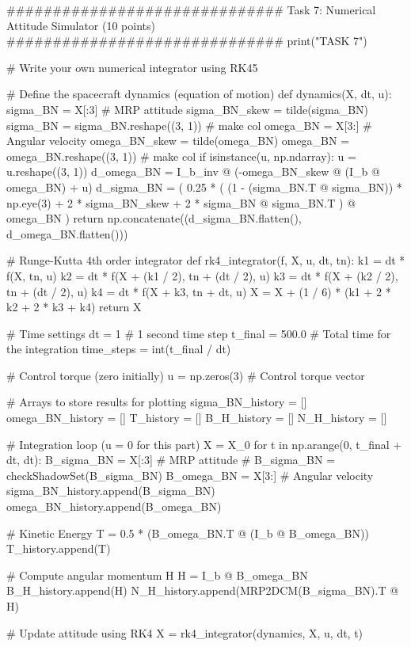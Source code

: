 \documentclass[conf]{new-aiaa}
\begin{document}
\begin{pythoncode}
############################## Task 7: Numerical Attitude Simulator (10 points) ##############################
print("\n\nBEGIN TASK 7")

# Write your own numerical integrator using RK45


# Define the spacecraft dynamics (equation of motion)
def dynamics(X, dt, u):
    sigma_BN = X[:3]  # MRP attitude
    sigma_BN_skew = tilde(sigma_BN)
    sigma_BN = sigma_BN.reshape((3, 1))  # make col
    omega_BN = X[3:]  # Angular velocity
    omega_BN_skew = tilde(omega_BN)
    omega_BN = omega_BN.reshape((3, 1))  # make col
    if isinstance(u, np.ndarray):
        u = u.reshape((3, 1))
    d_omega_BN = I_b_inv @ (-omega_BN_skew @ (I_b @ omega_BN) + u)
    d_sigma_BN = (
        0.25
        * (
            (1 - (sigma_BN.T @ sigma_BN)) * np.eye(3)
            + 2 * sigma_BN_skew
            + 2 * sigma_BN @ sigma_BN.T
        )
        @ omega_BN
    )
    return np.concatenate((d_sigma_BN.flatten(), d_omega_BN.flatten()))


# Runge-Kutta 4th order integrator
def rk4_integrator(f, X, u, dt, tn):
    k1 = dt * f(X, tn, u)
    k2 = dt * f(X + (k1 / 2), tn + (dt / 2), u)
    k3 = dt * f(X + (k2 / 2), tn + (dt / 2), u)
    k4 = dt * f(X + k3, tn + dt, u)
    X = X + (1 / 6) * (k1 + 2 * k2 + 2 * k3 + k4)
    return X


# Time settings
dt = 1  # 1 second time step
t_final = 500.0  # Total time for the integration
time_steps = int(t_final / dt)

# Control torque (zero initially)
u = np.zeros(3)  # Control torque vector

# Arrays to store results for plotting
sigma_BN_history = []
omega_BN_history = []
T_history = []
B_H_history = []
N_H_history = []

# Integration loop (u = 0 for this part)
X = X_0
for t in np.arange(0, t_final + dt, dt):
    B_sigma_BN = X[:3]  # MRP attitude
    # B_sigma_BN = checkShadowSet(B_sigma_BN)
    B_omega_BN = X[3:]  # Angular velocity
    sigma_BN_history.append(B_sigma_BN)
    omega_BN_history.append(B_omega_BN)

    # Kinetic Energy
    T = 0.5 * (B_omega_BN.T @ (I_b @ B_omega_BN))
    T_history.append(T)

    # Compute angular momentum H
    H = I_b @ B_omega_BN
    B_H_history.append(H)
    N_H_history.append(MRP2DCM(B_sigma_BN).T @ H)

    # Update attitude using RK4
    X = rk4_integrator(dynamics, X, u, dt, t)


\end{pythoncode}
\end{document}
